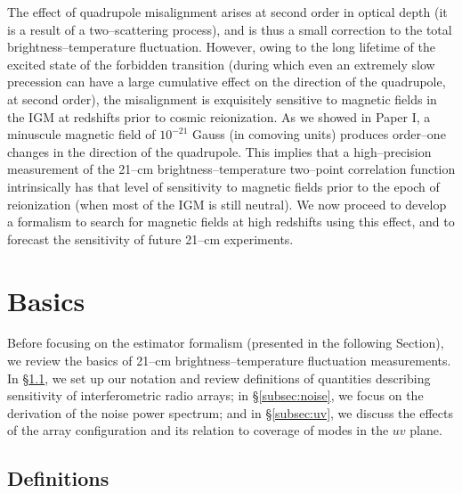 \documentclass[aps,prd,twocolumn,floatfix,showpacs,superscriptaddress,nofootinbib]{revtex4-1}
\begin{document}
The effect of quadrupole misalignment arises at second order in optical depth (it is a result of a two--scattering process), and is thus a small correction to the total brightness--temperature fluctuation. However, owing to the long lifetime of the excited state of the forbidden transition (during which even an extremely slow precession can have a large cumulative effect on the direction of the quadrupole, at second order), the misalignment is exquisitely sensitive to magnetic fields in the IGM at redshifts prior to cosmic reionization. As we showed in Paper I, a minuscule magnetic field of  $10^{-21}$ Gauss (in comoving units) produces order--one changes in the direction of the quadrupole. This implies that a high--precision measurement of the 21--cm brightness--temperature two--point correlation function intrinsically has that level of sensitivity to magnetic fields prior to the epoch of reionization (when most of the IGM is still neutral). We now proceed to develop a formalism to search for magnetic fields at high redshifts using this effect, and to forecast the sensitivity of future 21--cm experiments. 

\section{Basics}
\label{sec:basics}

Before focusing on the estimator formalism (presented in the following Section), we review the basics of 21--cm brightness--temperature fluctuation measurements. In \S\ref{subsec:def}, we set up our notation and review definitions of quantities describing sensitivity of interferometric radio arrays; in \S\ref{subsec:noise}, we focus on the derivation of the noise power spectrum; and in \S\ref{subsec:uv}, we discuss the effects of the array configuration and its relation to coverage of modes in the $uv$ plane. 

\subsection{Definitions}
\label{subsec:def}
\end{document}
